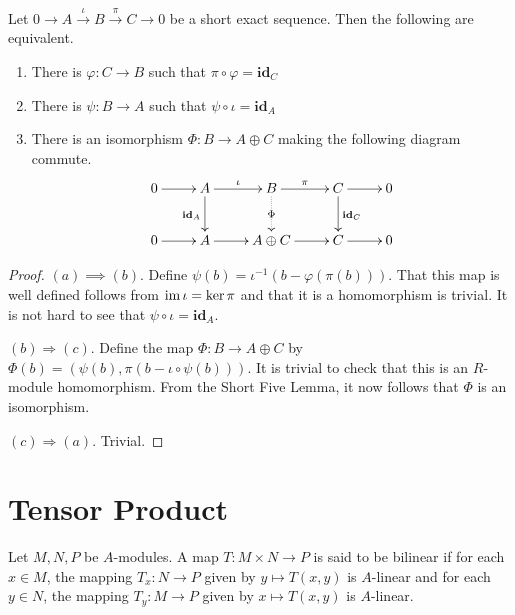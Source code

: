 \begin{lemma}
    Let $0\longrightarrow A\stackrel{\iota}{\longrightarrow}B\stackrel{\pi}{\longrightarrow}C\longrightarrow 0$ be a short exact sequence. Then the following are equivalent.
    \begin{enumerate}[label=(\alph*)]
        \item There is $\varphi: C\to B$ such that $\pi\circ\varphi = \mathbf{id}_C$ 
        \item There is $\psi: B\to A$ such that $\psi\circ\iota = \mathbf{id}_A$ 
        \item There is an isomorphism $\Phi: B\to A\oplus C$ making the following diagram commute.
        \begin{equation*}
            \xymatrix {
                0\ar[r] & A\ar[d]_{\mathbf{id}_A}\ar[r]^\iota & B\ar[r]^\pi\ar@{.>}[d]|-{\Phi} & C\ar[d]^{\mathbf{id}_C}\ar[r] & 0\\
                0\ar[r] & A\ar[r] & A\oplus C\ar[r] & C\ar[r] & 0\\
            }
        \end{equation*}
    \end{enumerate}
\end{lemma}
\begin{proof}
$(a)\implies(b)$. Define $\psi(b) = \iota^{-1}(b - \varphi(\pi(b)))$. That this map is well defined follows from $\operatorname{im}\iota = \ker\pi$ and that it is a homomorphism is trivial. It is not hard to see that $\psi\circ\iota = \mathbf{id}_A$.

$(b)\Longrightarrow(c)$. Define the map $\Phi: B\to A\oplus C$ by $\Phi(b) = (\psi(b), \pi(b - \iota\circ\psi(b)))$. It is trivial to check that this is an $R$-module homomorphism. From the Short Five Lemma, it now follows that $\Phi$ is an isomorphism.

$(c)\Longrightarrow(a)$. Trivial.
\end{proof}


\section{Tensor Product}

\begin{definition}
    Let $M, N, P$ be $A$-modules. A map $T: M\times N\to P$ is said to be bilinear if for each $x\in M$, the mapping $T_x: N\to P$ given by $y\mapsto T(x,y)$ is $A$-linear and for each $y\in N$, the mapping $T_y: M\to P$ given by $x\mapsto T(x,y)$ is $A$-linear.
\end{definition}

